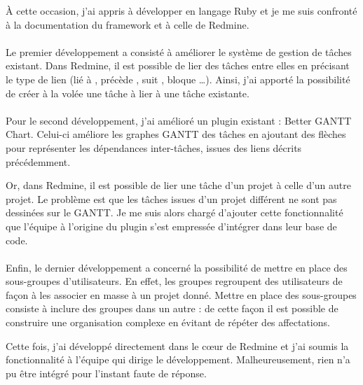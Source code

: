 À cette occasion, j'ai appris à développer en langage Ruby et je me suis confronté à la documentation du framework \aror{} et à celle de Redmine.

\paragraph{}
Le premier développement a consisté à améliorer le système de gestion de tâches existant.
Dans Redmine, il est possible de lier des tâches entre elles en précisant le type de lien (\og lié à \fg, \og précède \fg, \og suit \fg, \og bloque \fg\ldots).
Ainsi, j'ai apporté la possibilité de créer à la volée une tâche à lier à une tâche existante.

\paragraph{}
Pour le second développement, j'ai amélioré un plugin existant : Better GANTT Chart.
Celui-ci améliore les graphes GANTT des tâches en ajoutant des flèches pour représenter les dépendances inter-tâches, issues des liens décrits précédemment.

Or, dans Redmine, il est possible de lier une tâche d'un projet à celle d'un autre projet.
Le problème est que les tâches issues d'un projet différent ne sont pas dessinées sur le GANTT. 
Je me suis alors chargé d'ajouter cette fonctionnalité que l'équipe à l'origine du plugin s'est empressée d'intégrer dans leur base de code.

\paragraph{}
Enfin, le dernier développement a concerné la possibilité de mettre en place des sous-groupes d'utilisateurs.
En effet, les groupes regroupent des utilisateurs de façon à les associer en masse à un projet donné.
Mettre en place des sous-groupes consiste à inclure des groupes dans un autre : de cette façon il est possible de construire une organisation complexe en évitant de répéter des affectations. 

Cette fois, j'ai développé directement dans le c\oe ur de Redmine et j'ai soumis la fonctionnalité à l'équipe qui dirige le développement.
Malheureusement, rien n'a pu être intégré pour l'instant faute de réponse.

